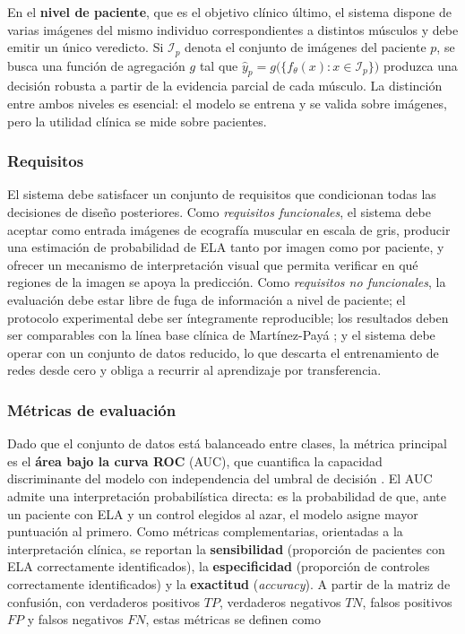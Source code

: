 \documentclass[12pt]{extarticle}
\numberwithin{equation}{section}
\begin{document}
\begin{refsection}
En el \textbf{nivel de paciente}, que es el objetivo clínico último, el sistema dispone de varias imágenes del mismo individuo correspondientes a distintos músculos y debe emitir un único veredicto. Si $\mathcal{I}_p$ denota el conjunto de imágenes del paciente $p$, se busca una función de agregación $g$ tal que $\hat{y}_p = g\bigl(\{f_\theta(x) : x \in \mathcal{I}_p\}\bigr)$ produzca una decisión robusta a partir de la evidencia parcial de cada músculo. La distinción entre ambos niveles es esencial: el modelo se entrena y se valida sobre imágenes, pero la utilidad clínica se mide sobre pacientes.

\subsubsection{Requisitos}

El sistema debe satisfacer un conjunto de requisitos que condicionan todas las decisiones de diseño posteriores. Como \textit{requisitos funcionales}, el sistema debe aceptar como entrada imágenes de ecografía muscular en escala de gris, producir una estimación de probabilidad de ELA tanto por imagen como por paciente, y ofrecer un mecanismo de interpretación visual que permita verificar en qué regiones de la imagen se apoya la predicción. Como \textit{requisitos no funcionales}, la evaluación debe estar libre de fuga de información a nivel de paciente; el protocolo experimental debe ser íntegramente reproducible; los resultados deben ser comparables con la línea base clínica de Martínez-Payá \cite{martinezpaya2017quantitative}; y el sistema debe operar con un conjunto de datos reducido, lo que descarta el entrenamiento de redes desde cero y obliga a recurrir al aprendizaje por transferencia.

\subsubsection{Métricas de evaluación}

Dado que el conjunto de datos está balanceado entre clases, la métrica principal es el \textbf{área bajo la curva ROC} (AUC), que cuantifica la capacidad discriminante del modelo con independencia del umbral de decisión \cite{hanley1982meaning}. El AUC admite una interpretación probabilística directa: es la probabilidad de que, ante un paciente con ELA y un control elegidos al azar, el modelo asigne mayor puntuación al primero. Como métricas complementarias, orientadas a la interpretación clínica, se reportan la \textbf{sensibilidad} (proporción de pacientes con ELA correctamente identificados), la \textbf{especificidad} (proporción de controles correctamente identificados) y la \textbf{exactitud} (\textit{accuracy}). A partir de la matriz de confusión, con verdaderos positivos $TP$, verdaderos negativos $TN$, falsos positivos $FP$ y falsos negativos $FN$, estas métricas se definen como


\end{refsection}
\end{document}

